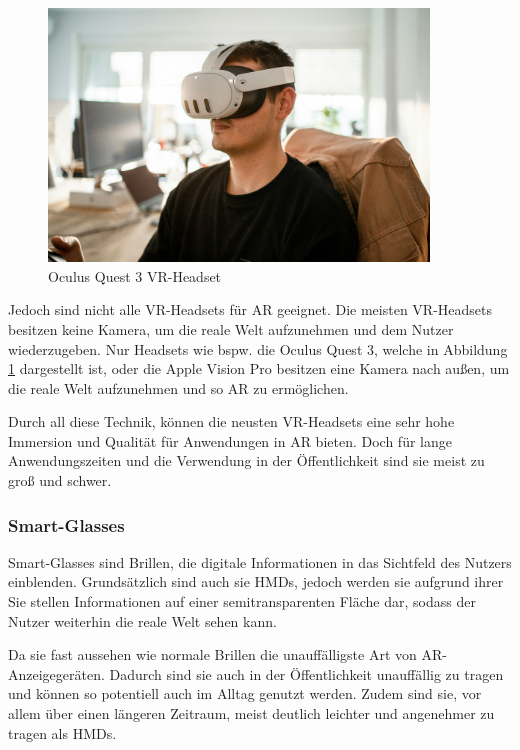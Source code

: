     \begin{figure}[H]
      \centering
      \includegraphics[width=0.9\textwidth]{images/quest3_example.jpg}
      \caption{Oculus Quest 3 VR-Headset}
      \label{fig:oculus-quest-3}
    \end{figure}

    Jedoch sind nicht alle VR-Headsets für AR geeignet.
    Die meisten VR-Headsets besitzen keine Kamera, um die reale Welt aufzunehmen und dem Nutzer wiederzugeben.
    Nur Headsets wie bspw. die Oculus Quest 3, welche in Abbildung \ref{fig:oculus-quest-3} dargestellt ist, oder die Apple Vision Pro besitzen eine Kamera nach außen, um die reale Welt aufzunehmen und so AR zu ermöglichen.
    
    Durch all diese Technik, können die neusten VR-Headsets eine sehr hohe Immersion und Qualität für Anwendungen in AR bieten.
    Doch für lange Anwendungszeiten und die Verwendung in der Öffentlichkeit sind sie meist zu groß und schwer.

   

    \subsubsection{Smart-Glasses}

    Smart-Glasses sind Brillen, die digitale Informationen in das Sichtfeld des Nutzers einblenden.
    Grundsätzlich sind auch sie HMDs, jedoch werden sie aufgrund ihrer 
    Sie stellen Informationen auf einer semitransparenten Fläche dar, sodass der Nutzer weiterhin die reale Welt sehen kann.

    Da sie fast aussehen wie normale Brillen die unauffälligste Art von AR-Anzeigegeräten.
    Dadurch sind sie auch in der Öffentlichkeit unauffällig zu tragen und können so potentiell auch im Alltag genutzt werden.
    Zudem sind sie, vor allem über einen längeren Zeitraum, meist deutlich leichter und angenehmer zu tragen als HMDs.



